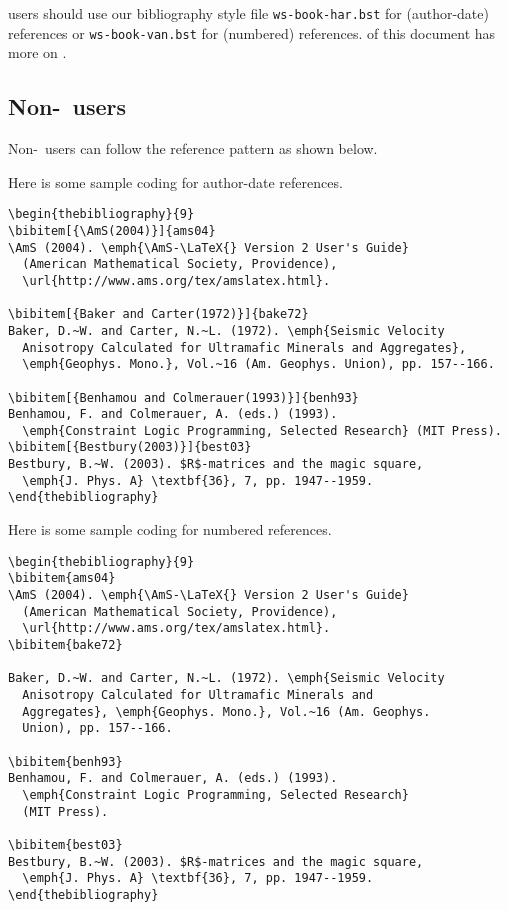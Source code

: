 \btex\index{\btex} users should use our bibliography style file
\verb|ws-book-har.bst| for (author-date) references or
\verb|ws-book-van.bst| for (numbered) references.  of this document has more on \btex.

\subsection{Non-\btex\ users}
Non-\btex\ users can follow the reference pattern as shown below.

Here is some sample coding for author-date references.

\begin{verbatim}
\begin{thebibliography}{9}
\bibitem[{\AmS(2004)}]{ams04}
\AmS (2004). \emph{\AmS-\LaTeX{} Version 2 User's Guide}
  (American Mathematical Society, Providence),
  \url{http://www.ams.org/tex/amslatex.html}.

\bibitem[{Baker and Carter(1972)}]{bake72}
Baker, D.~W. and Carter, N.~L. (1972). \emph{Seismic Velocity
  Anisotropy Calculated for Ultramafic Minerals and Aggregates},
  \emph{Geophys. Mono.}, Vol.~16 (Am. Geophys. Union), pp. 157--166.

\bibitem[{Benhamou and Colmerauer(1993)}]{benh93}
Benhamou, F. and Colmerauer, A. (eds.) (1993).
  \emph{Constraint Logic Programming, Selected Research} (MIT Press).
\bibitem[{Bestbury(2003)}]{best03}
Bestbury, B.~W. (2003). $R$-matrices and the magic square,
  \emph{J. Phys. A} \textbf{36}, 7, pp. 1947--1959.
\end{thebibliography}
\end{verbatim}

Here is some sample coding for numbered references.
\enlargethispage{12pt}
\begin{verbatim}
\begin{thebibliography}{9}
\bibitem{ams04}
\AmS (2004). \emph{\AmS-\LaTeX{} Version 2 User's Guide}
  (American Mathematical Society, Providence),
  \url{http://www.ams.org/tex/amslatex.html}.
\bibitem{bake72}

Baker, D.~W. and Carter, N.~L. (1972). \emph{Seismic Velocity
  Anisotropy Calculated for Ultramafic Minerals and
  Aggregates}, \emph{Geophys. Mono.}, Vol.~16 (Am. Geophys.
  Union), pp. 157--166.

\bibitem{benh93}
Benhamou, F. and Colmerauer, A. (eds.) (1993).
  \emph{Constraint Logic Programming, Selected Research}
  (MIT Press).

\bibitem{best03}
Bestbury, B.~W. (2003). $R$-matrices and the magic square,
  \emph{J. Phys. A} \textbf{36}, 7, pp. 1947--1959.
\end{thebibliography}
\end{verbatim}

